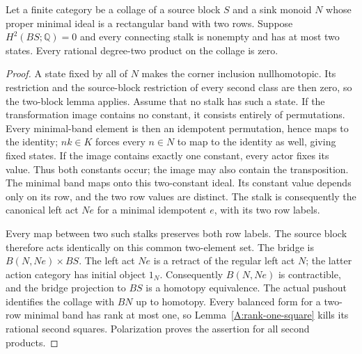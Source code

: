 \begin{lemma}
\label{CP2:A-binary-two-row-sink}
Let a finite category be a collage of a source block $S$ and a
sink monoid $N$ whose proper minimal ideal is a rectangular band
with two rows. Suppose $H^2(BS;\mathbb Q)=0$ and every connecting
stalk is nonempty and has at most two states. Every rational
degree-two product on the collage is zero.
\end{lemma}
\begin{proof}
A state fixed by all of $N$ makes the corner inclusion nullhomotopic.
Its restriction and the source-block restriction of every second
class are then zero, so the two-block lemma applies.
Assume that no stalk has such a state. If the transformation
image contains no constant, it consists entirely of permutations.
Every minimal-band element is then an idempotent permutation, hence
maps to the identity; $nk\in K$ forces every $n\in N$ to map to
the identity as well, giving fixed states. If the image contains
exactly one constant, every actor fixes its value. Thus both
constants occur; the image may also contain the transposition.
The minimal band maps onto this two-constant ideal. Its constant
value depends only on its row, and the two row values are distinct.
The stalk is consequently the canonical left act $Ne$ for a
minimal idempotent $e$, with its two row labels.

Every map between two such stalks preserves both row labels.
The source block therefore acts identically on this common
two-element set. The bridge is $B(N,Ne)\times BS$.
The left act $Ne$ is a retract of the regular left act $N$;
the latter action category has initial object $1_N$.
Consequently $B(N,Ne)$ is contractible, and the bridge projection
to $BS$ is a homotopy equivalence. The actual pushout identifies
the collage with $BN$ up to homotopy. Every balanced form for a
two-row minimal band has rank at most one, so
Lemma~\ref{A:rank-one-square} kills its rational second squares.
Polarization proves the assertion for all second products.
\end{proof}

